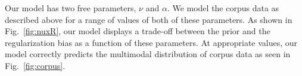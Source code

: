 \documentclass{evolang11}
\begin{document}
Our model has two free parameters, $\nu$ and $\alpha$. We model the corpus data as described above for a range of values of both of these parameters. As shown in Fig.\ \ref{fig:nuxR}, our model displays a trade-off between the prior and the regularization bias as a function of these parameters. At appropriate values, our model correctly predicts the multimodal distribution of corpus data as seen in Fig.\ \ref{fig:corpus}.%
\end{document}
